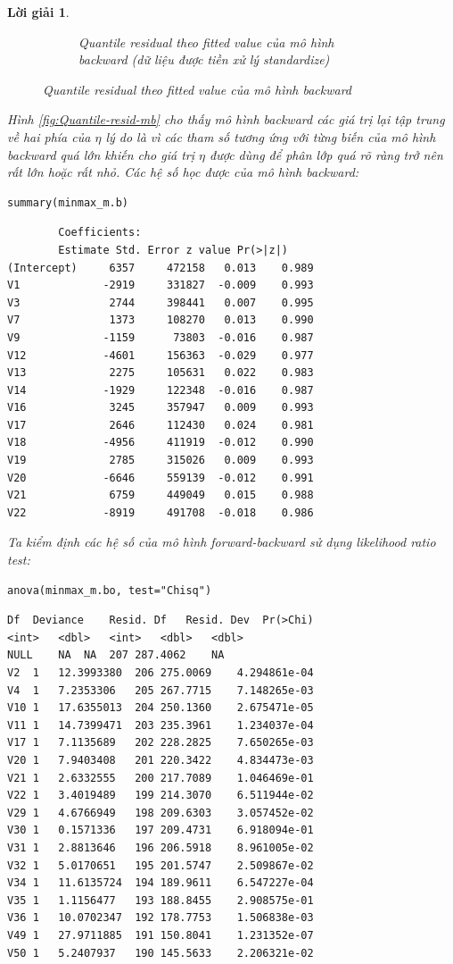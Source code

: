 \documentclass[14pt, a4paper]{article}
\theoremstyle{sltheorem}
\theoremstyle{soltheorem}
\newtheorem*{loigiai}{Lời giải}
\begin{document}
\begin{loigiai}
\begin{figure}[h!]
\begin{subfigure}[b]{0.4\textwidth}
            \caption{Quantile residual theo fitted value của mô hình backward (dữ liệu được tiền xử lý standardize)}
        \end{subfigure}
        \caption{Quantile residual theo fitted value của mô hình backward}
        \label{fig:Quantile-fitted-mb}
    \end{figure}

    Hình \ref{fig:Quantile-resid-mb} cho thấy mô hình backward các giá trị lại tập trung về hai phía của $\eta$ lý do là vì các tham số tương ứng với từng biến của mô hình backward quá lớn khiến cho giá trị $\eta$ được dùng để phân lớp quá rõ ràng trở nên rất lớn hoặc rất nhỏ.
    Các hệ số học được của mô hình backward:

    \begin{verbatim}
summary(minmax_m.b)
    \end{verbatim}

    \begin{verbatim}
        Coefficients:
        Estimate Std. Error z value Pr(>|z|)
(Intercept)     6357     472158   0.013    0.989
V1             -2919     331827  -0.009    0.993
V3              2744     398441   0.007    0.995
V7              1373     108270   0.013    0.990
V9             -1159      73803  -0.016    0.987
V12            -4601     156363  -0.029    0.977
V13             2275     105631   0.022    0.983
V14            -1929     122348  -0.016    0.987
V16             3245     357947   0.009    0.993
V17             2646     112430   0.024    0.981
V18            -4956     411919  -0.012    0.990
V19             2785     315026   0.009    0.993
V20            -6646     559139  -0.012    0.991
V21             6759     449049   0.015    0.988
V22            -8919     491708  -0.018    0.986
    \end{verbatim}

    Ta kiểm định các hệ số của mô hình forward-backward sử dụng likelihood ratio test:

    \begin{verbatim}
anova(minmax_m.bo, test="Chisq")
    \end{verbatim}
    
    \begin{verbatim}
Df	Deviance	Resid. Df	Resid. Dev	Pr(>Chi)
<int>	<dbl>	<int>	<dbl>	<dbl>
NULL	NA	NA	207	287.4062	NA
V2	1	12.3993380	206	275.0069	4.294861e-04
V4	1	7.2353306	205	267.7715	7.148265e-03
V10	1	17.6355013	204	250.1360	2.675471e-05
V11	1	14.7399471	203	235.3961	1.234037e-04
V17	1	7.1135689	202	228.2825	7.650265e-03
V20	1	7.9403408	201	220.3422	4.834473e-03
V21	1	2.6332555	200	217.7089	1.046469e-01
V22	1	3.4019489	199	214.3070	6.511944e-02
V29	1	4.6766949	198	209.6303	3.057452e-02
V30	1	0.1571336	197	209.4731	6.918094e-01
V31	1	2.8813646	196	206.5918	8.961005e-02
V32	1	5.0170651	195	201.5747	2.509867e-02
V34	1	11.6135724	194	189.9611	6.547227e-04
V35	1	1.1156477	193	188.8455	2.908575e-01
V36	1	10.0702347	192	178.7753	1.506838e-03
V49	1	27.9711885	191	150.8041	1.231352e-07
V50	1	5.2407937	190	145.5633	2.206321e-02        
    \end{verbatim}


\end{loigiai}
\end{document}
